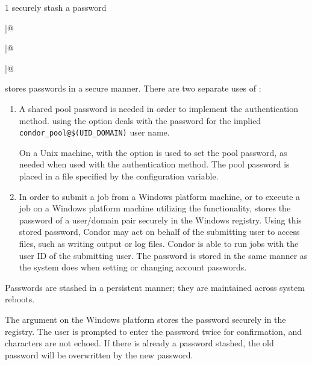 \begin{ManPage}{\label{man-condor-store-cred}}{1}
{securely stash a password}
\Synopsis
{}

\Lbr
{} \verb@|@ 
\Rbr 
{}

\Lbr
{} \verb@|@ 
\Rbr 
{}

\Lbr
{} \verb@|@ 
\Rbr 
{}


\Description 

 stores passwords in a secure manner.
There are two separate uses of :
\begin{enumerate}
\item A shared pool password is needed in order to implement the 
 authentication method.
 using the  option deals with the
password for the implied \verb|condor_pool@$(UID_DOMAIN)| user name.

On a Unix machine, 
 with the  option is used to set
the pool password,
as needed when used with the  authentication method.
The pool password is placed in a file specified by 
the  configuration variable.

\item In order to submit a job from a Windows platform machine,
or to execute a job on a Windows platform machine utilizing the
 functionality, 
 stores the password
of a user/domain pair securely in the Windows registry.
Using this stored password, 
Condor may act on behalf of the submitting user to access files,
such as writing output or log files. 
Condor is able to
run jobs with the user ID of the submitting user.
The password is stored in the same manner as the system does when
setting or changing account passwords.
\end{enumerate}

Passwords are stashed in a persistent manner; they are maintained
across system reboots.

The  argument on the Windows platform 
stores the password securely in the registry.
The user is prompted to enter the password twice for confirmation, 
and characters are not echoed.
If there is already a password stashed,
the old password will be overwritten by the new password.


\end{ManPage}
